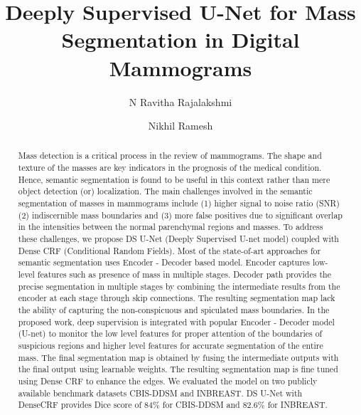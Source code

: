 \documentclass[review]{elsarticle}
\newcommand{\<}{${<}$}
\begin{document}
\begin{frontmatter}

\title{Deeply Supervised U-Net for Mass Segmentation in Digital Mammograms}
\author{N Ravitha Rajalakshmi}
\author{Nikhil Ramesh}
\date{}







\begin{abstract}
Mass detection is a critical process in the review of mammograms. The shape and texture of the masses are key indicators in the prognosis of the medical condition. Hence, semantic segmentation is found to be useful in this context rather than mere object detection (or) localization. The main challenges involved in the semantic segmentation of masses in mammograms include (1) higher signal to noise ratio (SNR) (2) indiscernible mass boundaries and (3) more false positives due to significant overlap in the intensities between the normal parenchymal regions and masses. To address these challenges, we propose DS U-Net (Deeply Supervised U-net model) coupled with Dense CRF (Conditional Random Fields). Most of the state-of-art approaches for semantic segmentation uses Encoder - Decoder based model. Encoder captures low-level features such as presence of mass in multiple stages. Decoder path provides the precise segmentation in multiple stages by combining the intermediate results from the encoder at each stage through skip connections. The resulting segmentation map lack the ability of capturing the non-conspicuous and spiculated mass boundaries. In the proposed work, deep supervision is integrated with popular Encoder - Decoder model (U-net) to monitor the low level features for proper attention of the boundaries of suspicious regions and higher level features for accurate segmentation of the entire mass. The final segmentation map is obtained by fusing the intermediate outputs with the final output using learnable weights. The resulting segmentation map is fine tuned using Dense CRF to enhance the edges. We evaluated the model on two publicly available benchmark datasets CBIS-DDSM and INBREAST. DS U-Net with DenseCRF provides Dice score of 84\% for CBIS-DDSM and 82.6\% for INBREAST.  
\end{abstract}


\end{frontmatter}
\end{document}
